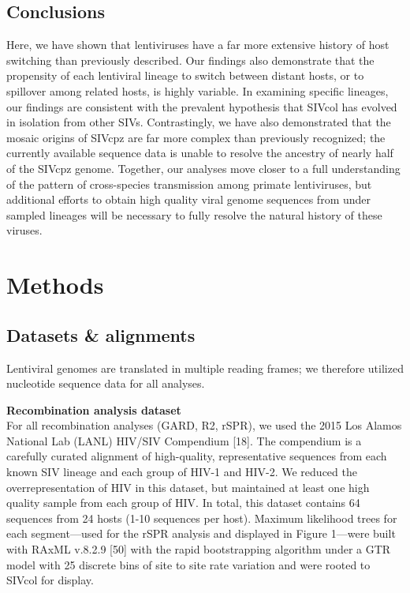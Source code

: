 \subsection*{Conclusions}
Here, we have shown that lentiviruses have a far more extensive history of host switching than previously described.
Our findings also demonstrate that the propensity of each lentiviral lineage to switch between distant hosts, or to spillover among related hosts, is highly variable.
In examining specific lineages, our findings are consistent with the prevalent hypothesis that SIVcol has evolved in isolation from other SIVs.
Contrastingly, we have also demonstrated that the mosaic origins of SIVcpz are far more complex than previously recognized; the currently available sequence data is unable to resolve the ancestry of nearly half of the SIVcpz genome.
Together, our analyses move closer to a full understanding of the pattern of cross-species transmission among primate lentiviruses, but additional efforts to obtain high quality viral genome sequences from under sampled lineages will be necessary to fully resolve the natural history of these viruses.


\section{Methods}
\subsection*{Datasets & alignments}
Lentiviral genomes are translated in multiple reading frames; we therefore utilized nucleotide sequence data for all analyses.

\textbf{Recombination analysis dataset}\\
For all recombination analyses (GARD, R2, rSPR), we used the 2015 Los Alamos National Lab (LANL) HIV/SIV Compendium [18].
The compendium is a carefully curated alignment of high-quality, representative sequences from each known SIV lineage and each group of HIV-1 and HIV-2.
We reduced the overrepresentation of HIV in this dataset, but maintained at least one high quality sample from each group of HIV.
In total, this dataset contains 64 sequences from 24 hosts (1-10 sequences per host).
Maximum likelihood trees for each segment—used for the rSPR analysis and displayed in Figure 1—were built with RAxML v.8.2.9 [50] with the rapid bootstrapping algorithm under a GTR model with 25 discrete bins of site to site rate variation and were rooted to SIVcol for display.

